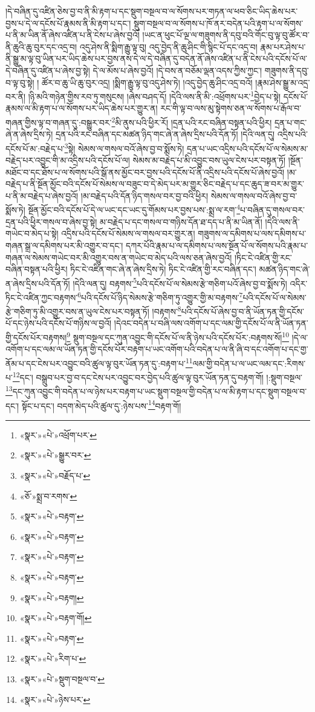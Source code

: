 །དེ་བཞིན་དུ་འཛིན་ཅེས་བྱ་བ་ནི་མི་རྟག་པ་དང་སྡུག་བསྔལ་བ་ལ་སོགས་པར་གཏན་ལ་ཕབ་ཅིང་ཡིད་ཆེས་པར་བྱས་པ་དེ་ལ་དངོས་པོ་རྣམས་ནི་མི་རྟག་པ་དང་། སྡུག་བསྔལ་བ་ལ་སོགས་པ་ཁོ་ནར་བདེན་པའི་རྟག་པ་ལ་སོགས་པ་ནི་མ་ཡིན་ནོ་ཞེས་འཛིན་པ་ནི་ངེས་པ་ཞེས་བྱའོ། །ཡང་ན་ཕུང་པོ་ལྔ་ལ་གཟུགས་ནི་དབུ་བའི་གོང་བུ་ལྟ་བུ་ཚོར་བ་ནི་ཆུའི་ཆུ་བུར་དང་འདྲ་བ། འདུ་ཤེས་ནི་སྨིག་རྒྱུ་ལྟ་བུ། འདུ་བྱེད་ནི་ཆུ་ཤིང་གི་སྙིང་པོ་དང་འདྲ་བ། རྣམ་པར་ཤེས་པ་ནི་སྒྱུ་མ་ལྟ་བུ་ཡིན་པར་ཡིད་ཆེས་པར་བྱས་ནས་དེ་ལ་དེ་བཞིན་དུ་བདེན་ནོ་ཞེས་འཛིན་པ་ནི་ངེས་པའི་དངོས་པོ་ལ་དེ་བཞིན་དུ་འཛིན་པ་ཞེས་བྱ་སྟེ། དེ་ལ་མོས་པ་ཞེས་བྱའོ། །དེ་བས་ན་བཅོམ་ལྡན་འདས་ཀྱིས་ཀྱང་། གཟུགས་ནི་དབུ་བ་ལྟ་བུ་སྟེ། །
ཚོར་བ་ཆུ་ཡི་ཆུ་བུར་འདྲ། །སྨིག་རྒྱུ་ལྟ་བུ་འདུ་ཤེས་ཏེ། །འདུ་བྱེད་ཆུ་ཤིང་འདྲ་བའོ། །རྣམ་ཤེས་སྒྱུ་མ་འདྲ་བར་ནི། །ཉི་མའི་གཉེན་གྱིས་རབ་ཏུ་གསུངས། །ཞེས་བཤད་དོ། །དེའི་ལས་ནི་མི་:འཕྲོགས་པར་\footnote{«སྣར་»«པེ་»འཕྲོག་པར་}བྱེད་པ་སྟེ། དངོས་པོ་རྣམས་ལ་མི་རྟག་པ་ལ་སོགས་པར་ཡིད་ཆེས་པར་གྱུར་ན། རང་གི་ལྟ་བ་ལས་མུ་སྟེགས་ཅན་ལ་སོགས་པ་རྒོལ་བ་གཞན་གྱིས་ལྟ་བ་གཞན་དུ་:བསྒྱུར་བར་\footnote{«སྣར་»«པེ་»སྒྱུར་བར་}མི་ནུས་པའི་ཕྱིར་རོ། །དྲན་པའི་རང་བཞིན་བསྟན་པའི་ཕྱིར། དྲན་པ་གང་ཞེ་ན་ཞེས་དྲིས་ཏེ། དྲན་པའི་རང་བཞིན་དང་མཚན་ཉིད་གང་ཞེ་ན་ཞེས་དྲིས་པའི་དོན་ཏོ། །དེའི་ལན་དུ། འདྲིས་པའི་དངོས་པོ་མ་:བརྗེད་པ་\footnote{«སྣར་»«པེ་»བརྗོད་པ་}སྟེ། སེམས་ལ་གསལ་བའོ་ཞེས་བྱ་བ་སྨོས་ཏེ། དྲན་པ་ཡང་འདྲིས་པའི་དངོས་པོ་ལ་སེམས་མ་བརྗེད་པར་འབྱུང་གི་མ་འདྲིས་པའི་དངོས་པོ་ལ། སེམས་མ་བརྗེད་པ་མི་འབྱུང་བས་ཡུལ་ངེས་པར་བསྟན་ཏོ། །སྔོན་མཐོང་བ་དང་ཐོས་པ་ལ་སོགས་པའི་སྒོ་ནས་མྱོང་བར་བྱས་པའི་དངོས་པོ་ནི་འདྲིས་པའི་དངོས་པོ་ཞེས་བྱའོ། །མ་བརྗེད་པ་ནི་སྔོན་མྱོང་བའི་དངོས་པོ་སེམས་ལ་བཟུང་བ་དེ་མེད་པར་མ་གྱུར་ཅིང་བརྗེད་པ་དང་ཆུད་ཟ་བར་མ་གྱུར་པ་ནི་མ་བརྗེད་པ་ཞེས་བྱའོ། །མ་བརྗེད་པའི་དོན་ཉིད་གསལ་བར་བྱ་བའི་ཕྱིར། སེམས་ལ་གསལ་བའོ་ཞེས་བྱ་བ་སྨོས་ཏེ། སྔོན་མྱོང་བའི་དངོས་པོ་དེ་ལ་ཡང་དང་ཡང་དུ་གོམས་པར་བྱས་པས་:སྨྲ་ལ་རག་\footnote{«ཅོ་»སྨྲ་བ་རགས་}པ་བཞིན་དུ་གསལ་བར་དྲན་པའི་ཕྱིར་གསལ་བ་ཞེས་བྱ་སྟེ། མ་བརྗེད་པ་དང་གསལ་བ་གཉིས་དོན་ཐ་དད་པ་ནི་མ་ཡིན་ནོ། །དེའི་ལས་ནི་གཡེང་བ་མེད་པ་སྟེ། འདྲིས་པའི་དངོས་པོ་སེམས་ལ་གསལ་བར་གྱུར་ན། གཟུགས་ལ་དམིགས་པ་ལས་དམིགས་པ་གཞན་སྒྲ་ལ་དམིགས་པར་མི་འགྱུར་བ་དང་། དཀར་པོའི་རྣམ་པ་ལ་དམིགས་པ་ལས་སྔོན་པོ་ལ་སོགས་པའི་རྣམ་པ་གཞན་ལ་སེམས་གཡེང་བར་མི་འགྱུར་བས་ན་གཡེང་བ་མེད་པའི་ལས་ཅན་ཞེས་བྱའོ། །ཏིང་ངེ་འཛིན་གྱི་རང་བཞིན་བསྟན་པའི་ཕྱིར། ཏིང་ངེ་འཛིན་གང་ཞེ་ན་ཞེས་དྲིས་ཏེ། ཏིང་ངེ་འཛིན་གྱི་རང་བཞིན་དང་། མཚན་ཉིད་གང་ཞེ་ན་ཞེས་དྲིས་པའི་དོན་ཏོ། །དེའི་ལན་དུ། བརྟགས་\footnote{«སྣར་»«པེ་»བརྟག་}པའི་དངོས་པོ་ལ་སེམས་རྩེ་གཅིག་པའོ་ཞེས་བྱ་བ་སྨོས་ཏེ། འདིར་ཏིང་ངེ་འཛིན་ཀྱང་བརྟགས་\footnote{«སྣར་»«པེ་»བརྟག་}པའི་དངོས་པོ་ཉིད་སེམས་རྩེ་གཅིག་ཏུ་འགྱུར་གྱི་མ་བརྟགས་\footnote{«སྣར་»«པེ་»བརྟག་}པའི་དངོས་པོ་ལ་སེམས་རྩེ་གཅིག་ཏུ་མི་འགྱུར་བས་ན་ཡུལ་ངེས་པར་བསྟན་ཏོ། །བརྟགས་\footnote{«སྣར་»«པེ་»བརྟག་}པའི་དངོས་པོ་ཞེས་བྱ་བ་ནི་ཡོན་ཏན་གྱི་དངོས་པོ་དང་ཉེས་པའི་དངོས་པོ་གཉིས་ལ་བྱའོ། །དེའང་བདེན་པ་བཞི་ལས་འགོག་པ་དང་ལམ་གྱི་དངོས་པོ་ལ་ནི་ཡོན་ཏན་གྱི་དངོས་པོར་བརྟགས།\footnote{«སྣར་»«པེ་»བརྟག།} སྡུག་བསྔལ་དང་ཀུན་འབྱུང་གི་དངོས་པོ་ལ་ནི་ཉེས་པའི་དངོས་པོར་:བརྟགས་སོ།\footnote{«སྣར་»«པེ་»བརྟག་གོ།} །དེ་ལ་འགོག་པ་དང་ལམ་ལ་ཡོན་ཏན་གྱི་དངོས་པོར་བརྟག་པ་ཡང་འགོག་པའི་བདེན་པ་ལ་ནི་ཞི་བ་དང་འགོག་པ་དང་གྱ་ནོམ་པ་དང་ངེས་པར་འབྱུང་བའི་ཚུལ་ལྟ་བུར་ཡོན་ཏན་དུ་:བརྟག་པ་\footnote{«སྣར་»«པེ་»བརྟག་}ལམ་གྱི་བདེན་པ་ལ་ཡང་ལམ་དང་:རིགས་པ་\footnote{«སྣར་»«པེ་»རིག་པ་}དང་། བསྒྲུབ་པར་བྱ་བ་དང་ངེས་པར་འབྱུང་བར་བྱེད་པའི་ཚུལ་ལྟ་བུར་ཡོན་ཏན་དུ་བརྟག་གོ། །:སྡུག་བསྔལ་\footnote{«སྣར་»«པེ་»སྡུག་བསྔལ་བ་}དང་ཀུན་འབྱུང་གི་བདེན་པ་ལ་ཉེས་པར་བརྟག་པ་ཡང་སྡུག་བསྔལ་གྱི་བདེན་པ་ལ་མི་རྟག་པ་དང་སྡུག་བསྔལ་བ་དང་། སྟོང་པ་དང་། བདག་མེད་པའི་ཚུལ་དུ་:ཉེས་པས་\footnote{«སྣར་»«པེ་»ཉེས་པར་}བརྟག་གོ། 